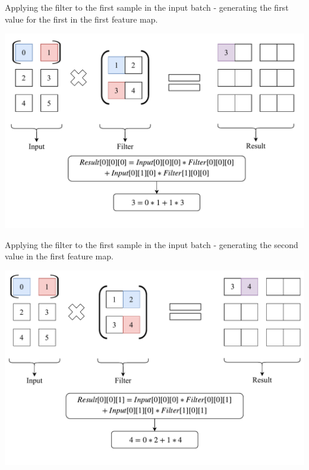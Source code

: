 \documentclass[12pt]{article}
\begin{document}
\newpage
\begin{blockfigure}{ Applying the filter to the first sample in the input batch - generating the first value for the first  in the first feature map.}
	\begin{center}
		\includegraphics[width=\textwidth]{firstConvSample_step1}
	\end{center}
\end{blockfigure}
\begin{blockfigure}{ Applying the filter to the first sample in the input batch - generating the second value in the first feature map.}
	\begin{center}
		\includegraphics[width=\textwidth]{firstConvSample_step2}
	\end{center}
\end{blockfigure}
\newpage
\end{document}
